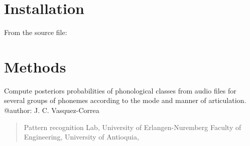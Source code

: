 \documentclass[letterpaper,10pt,english]{sphinxmanual}
\begin{document}
\chapter{Installation}
\label{\detokenize{index:installation}}
From the source file:

\begin{sphinxVerbatim}[commandchars=\\\{\}]
  
 
  
\end{sphinxVerbatim}


\chapter{Methods}
\label{\detokenize{index:methods}}\label{\detokenize{index:module-phonet}}
Compute posteriors probabilities of phonological classes from audio files for several groups of phonemes according to the mode and manner of articulation.
@author: J. C. Vasquez-Correa
\begin{quote}

Pattern recognition Lab, University of Erlangen-Nuremberg
Faculty of Engineering, University of Antioquia,
\end{quote}
\end{document}
